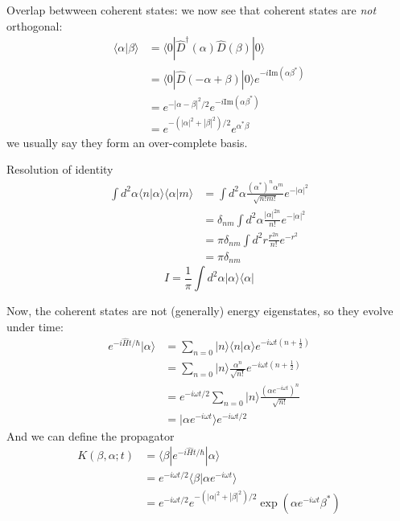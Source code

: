 Overlap betwween coherent states: we now see that coherent states are \emph{not} orthogonal:
\begin{align*}
    \langle \alpha |\beta \rangle &=\langle 0|\hat{D}^{\dagger}\left( \alpha \right) \hat{D}\left( \beta \right) |0\rangle \\
    &=\langle 0|\hat{D}\left( -\alpha +\beta \right) |0\rangle e^{-i\mathrm{Im}\left( \alpha \beta ^* \right)}\\
    &=e^{-\left| \alpha -\beta \right|^2/2}e^{-i\mathrm{Im}\left( \alpha \beta ^* \right)}\\
    &=e^{-\left( \left| \alpha \right|^2+\left| \beta \right|^2 \right) /2}e^{\alpha ^*\beta}
\end{align*}
we usually say they form an over-complete basis.

Resolution of identity
\begin{align*}
    \int{d^2\alpha \langle n|\alpha \rangle \langle \alpha |m\rangle}&=\int{d^2\alpha \frac{\left( \alpha ^* \right) ^n\alpha ^m}{\sqrt{n!m!}}e^{-\left| \alpha \right|^2}}\\
    &=\delta _{nm}\int{d^2\alpha \frac{\left| \alpha \right|^{2n}}{n!}e^{-\left| \alpha \right|^2}}\\
    &=\pi \delta _{nm}\int{d^2r\frac{r^{2n}}{n!}e^{-r^2}}\\
    &=\pi \delta _{nm}
\end{align*}
\[ I=\frac{1}{\pi}\int{d^2\alpha |\alpha \rangle \langle \alpha |}\]

Now, the coherent states are not (generally) energy eigenstates, so they evolve under time:
\begin{align*}
    e^{-i\hat{H}t/\hbar}|\alpha \rangle &=\sum_{n=0}{|n\rangle \langle n|\alpha \rangle e^{-i\omega t\left( n+\frac{1}{2} \right)}}\\
    &=\sum_{n=0}{|n\rangle \frac{\alpha ^n}{\sqrt{n!}}e^{-i\omega t\left( n+\frac{1}{2} \right)}}\\
    &=e^{-i\omega t/2}\sum_{n=0}{|n\rangle \frac{\left( \alpha e^{-i\omega t} \right) ^n}{\sqrt{n!}}}\\
    &=|\alpha e^{-i\omega t}\rangle e^{-i\omega t/2}
\end{align*}
And we can define the propagator
\begin{align*}
    K\left( \beta ,\alpha ;t \right) &=\langle \beta |e^{-i\hat{H}t/\hbar}|\alpha \rangle \\
    &=e^{-i\omega t/2}\langle \beta |\alpha e^{-i\omega t}\rangle\\
    &=e^{-i\omega t/2}e^{-\left( \left| \alpha \right|^2+\left| \beta \right|^2 \right) /2}\exp \left( \alpha e^{-i\omega t}\beta ^* \right)
\end{align*}

